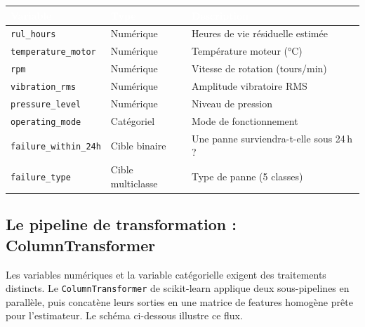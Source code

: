 \documentclass[11pt]{article}
\newcommand{\thead}[1]{\textbf{\textcolor{white}{#1}}}
\begin{document}
\begin{center}
\begin{tabularx}{\linewidth}{|l|l|>{\raggedright\arraybackslash}X|}
\hline
\rowcolor{tableHeader}
\thead{Variable} & \thead{Type} & \thead{Description} \\
\hline
\texttt{rul\_hours} & Numérique & Heures de vie résiduelle estimée \\
\hline
\texttt{temperature\_motor} & Numérique & Température moteur (°C) \\
\hline
\texttt{rpm} & Numérique & Vitesse de rotation (tours/min) \\
\hline
\texttt{vibration\_rms} & Numérique & Amplitude vibratoire RMS \\
\hline
\texttt{pressure\_level} & Numérique & Niveau de pression \\
\hline
\texttt{operating\_mode} & Catégoriel & Mode de fonctionnement \\
\hline\hline
\texttt{failure\_within\_24h} & Cible binaire & Une panne surviendra-t-elle sous 24\,h ? \\
\hline
\texttt{failure\_type} & Cible multiclasse & Type de panne (5 classes) \\
\hline
\end{tabularx}
\end{center}

\subsection{Le pipeline de transformation : ColumnTransformer}

Les variables numériques et la variable catégorielle exigent des traitements
distincts. Le \texttt{ColumnTransformer} de scikit-learn applique deux sous-pipelines
en parallèle, puis concatène leurs sorties en une matrice de features homogène
prête pour l'estimateur. Le schéma ci-dessous illustre ce flux.
\end{document}
